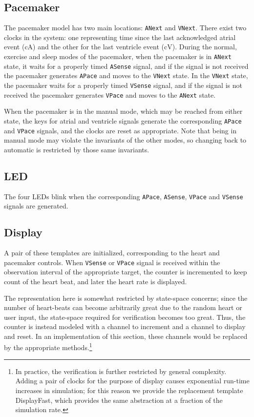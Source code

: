 \documentclass[a4paper]{article}
\begin{document}
\subsection{Pacemaker} The pacemaker model has two main locations: {\tt ANext} and {\tt VNext}. There exist two clocks in the system: one representing time since the last acknowledged atrial event (cA) and the other for the last ventricle event (cV). During the normal, exercise and sleep modes of the pacemaker, when the pacemaker is in {\tt ANext} state, it waits for a properly timed {\tt ASense} signal, and if the signal is not received the pacemaker generates {\tt APace} and moves to the {\tt VNext} state. In the {\tt VNext} state, the pacemaker waits for a properly timed {\tt VSense} signal, and if the signal is not received the pacemaker generates {\tt VPace} and moves to the {\tt ANext} state.

When the pacemaker is in the manual mode, which may be reached from either state, the keys for atrial and ventricle signals generate the corresponding {\tt APace} and {\tt VPace} signals, and the clocks are reset as appropriate.  Note that being in manual mode may violate the invariants of the other modes, so changing back to automatic is restricted by those same invariants.

\subsection{LED} The four LEDs blink when the corresponding {\tt APace}, {\tt ASense}, {\tt VPace} and {\tt VSense} signals are generated.

\subsection{Display} A pair of these templates are initialized, corresponding to the heart and pacemaker controls.  When {\tt VSense} or {\tt VPace} signal is received within the observation interval of the appropriate target, the counter is incremented to keep count of the heart beat, and later the heart rate is displayed. 

The representation here is somewhat restricted by state-space concerns; since the number of heart-beats can become arbitrarily great due to the random heart or user input, the state-space required for verification becomes too great.  Thus, the counter is instead modeled with a channel to increment and a channel to display and reset.  In an implementation of this section, these channels would be replaced by the appropriate methods.\footnote{In practice, the verification is further restricted by general complexity.  Adding a pair of clocks for the purpose of display causes exponential run-time increases in simulation; for this reason we provide the replacement template DisplayFast, which provides the same abstraction at a fraction of the simulation rate.}
\end{document}
